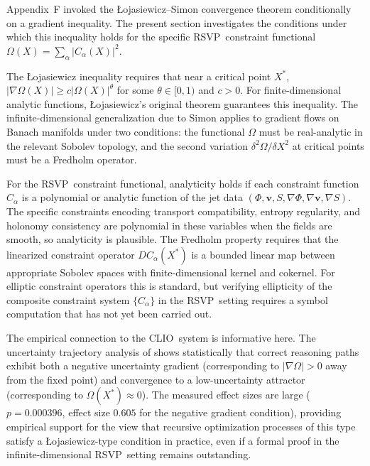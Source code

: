 \documentclass[12pt,a4paper]{article}
\newcommand{\RSVP}{\textrm{RSVP}}
\newcommand{\CLIO}{\textrm{CLIO}}
\begin{document}
Appendix~F invoked the Łojasiewicz--Simon convergence theorem conditionally on
a gradient inequality. The present section investigates the conditions under
which this inequality holds for the specific \RSVP\ constraint functional
$\Omega(X)=\sum_\alpha|C_\alpha(X)|^2$.

The Łojasiewicz inequality requires that near a critical point $X^\ast$,
$|\nabla\Omega(X)|\geq c|\Omega(X)|^\theta$ for some $\theta\in[0,1)$ and
$c>0$. For finite-dimensional analytic functions, Łojasiewicz's original
theorem \cite{Lojasiewicz1963} guarantees this inequality. The
infinite-dimensional generalization due to Simon \cite{Simon1983} applies to
gradient flows on Banach manifolds under two conditions: the functional $\Omega$
must be real-analytic in the relevant Sobolev topology, and the second variation
$\delta^2\Omega/\delta X^2$ at critical points must be a Fredholm operator.

For the \RSVP\ constraint functional, analyticity holds if each constraint
function $C_\alpha$ is a polynomial or analytic function of the jet data
$(\Phi,\mathbf{v},S,\nabla\Phi,\nabla\mathbf{v},\nabla S)$. The specific
constraints encoding transport compatibility, entropy regularity, and holonomy
consistency are polynomial in these variables when the fields are smooth, so
analyticity is plausible. The Fredholm property requires that the linearized
constraint operator $DC_\alpha(X^\ast)$ is a bounded linear map between
appropriate Sobolev spaces with finite-dimensional kernel and cokernel. For
elliptic constraint operators this is standard, but verifying ellipticity of
the composite constraint system $\{C_\alpha\}$ in the \RSVP\ setting requires
a symbol computation that has not yet been carried out.

The empirical connection to the \CLIO\ system is informative here. The
uncertainty trajectory analysis of \cite{Cheng2025} shows statistically that
correct reasoning paths exhibit both a negative uncertainty gradient
(corresponding to $|\nabla\Omega|>0$ away from the fixed point) and convergence
to a low-uncertainty attractor (corresponding to $\Omega(X^\ast)\approx 0$).
The measured effect sizes are large ($p=0.000396$, effect size $0.605$ for
the negative gradient condition), providing empirical support for the view that
recursive optimization processes of this type satisfy a Łojasiewicz-type
condition in practice, even if a formal proof in the infinite-dimensional
\RSVP\ setting remains outstanding.

\end{document}
